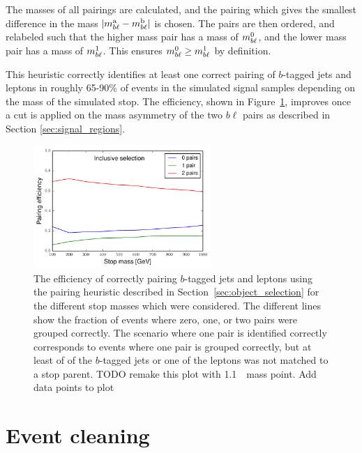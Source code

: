 The masses of all pairings are calculated, and the pairing which gives the 
smallest difference in the mass $|m_{b\ell}^\mathrm{a} - m_{b\ell}^\mathrm{b}|$
is chosen.
The pairs are then ordered, and relabeled such that the higher mass pair has a
mass of $m_{b\ell}^{0}$, and the lower mass pair has a mass of $m_{b\ell}^{1}$.
This ensures $m_{b\ell}^{0} \geq m_{b\ell}^{1}$ by definition.

This heuristic correctly identifies at least one correct pairing of $b$-tagged
jets and leptons in roughly 65-90\% of events in the simulated signal samples
depending on the mass of the simulated stop. The efficiency, shown in
Figure~\ref{fig:pairing_eff}, improves once a cut is applied on the mass
asymmetry of the two $b\ell$ pairs as described in Section
\ref{sec:signal_regions}.

\begin{figure}[ht]
  \centering
  \includegraphics[width=0.60\textwidth]
    {figs/blstop/PairingEfficiencies/pairing_eff__inclusive.pdf}
  \caption{The efficiency of correctly pairing $b$-tagged jets and leptons
    using the pairing heuristic described in Section~\ref{sec:object_selection}
    for the different stop masses which were considered.
    The different lines show the fraction of events where zero, one, or two
    pairs were grouped correctly.
    The scenario where one pair is identified correctly corresponds to events
    where one pair is grouped correctly, but at least of of the $b$-tagged jets
    or one of the leptons was not matched to a stop parent.
    {\color{red} TODO remake this plot with 1.1~\TeV\ mass point. Add data
    points to plot}
  }
  \label{fig:pairing_eff}
\end{figure}

\section{Event cleaning}
\label{sec:event_cleaning}


